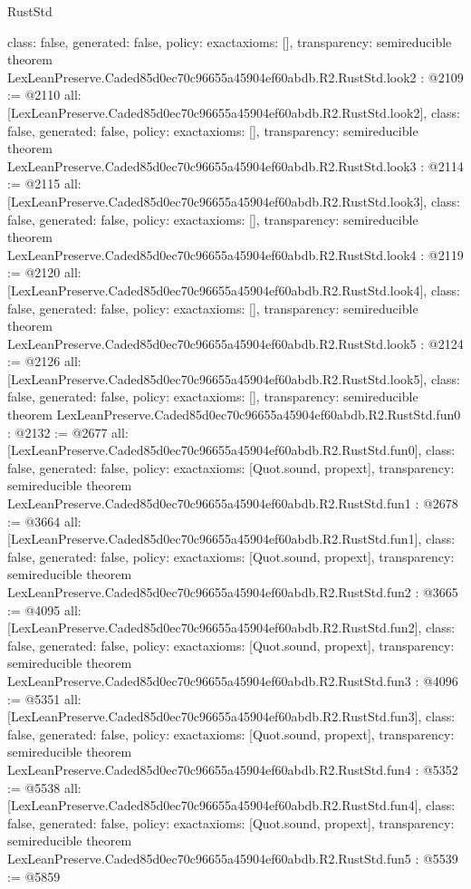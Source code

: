 \begin{lexlean}{RustStd}
\begin{coremodule}
{  class: false,
  generated: false,
  policy: exact{axioms: []},
  transparency: semireducible
}
theorem LexLeanPreserve.Caded85d0ec70c96655a45904ef60abdb.R2.RustStd.look2 : @2109 := @2110 {
  all: [LexLeanPreserve.Caded85d0ec70c96655a45904ef60abdb.R2.RustStd.look2],
  class: false,
  generated: false,
  policy: exact{axioms: []},
  transparency: semireducible
}
theorem LexLeanPreserve.Caded85d0ec70c96655a45904ef60abdb.R2.RustStd.look3 : @2114 := @2115 {
  all: [LexLeanPreserve.Caded85d0ec70c96655a45904ef60abdb.R2.RustStd.look3],
  class: false,
  generated: false,
  policy: exact{axioms: []},
  transparency: semireducible
}
theorem LexLeanPreserve.Caded85d0ec70c96655a45904ef60abdb.R2.RustStd.look4 : @2119 := @2120 {
  all: [LexLeanPreserve.Caded85d0ec70c96655a45904ef60abdb.R2.RustStd.look4],
  class: false,
  generated: false,
  policy: exact{axioms: []},
  transparency: semireducible
}
theorem LexLeanPreserve.Caded85d0ec70c96655a45904ef60abdb.R2.RustStd.look5 : @2124 := @2126 {
  all: [LexLeanPreserve.Caded85d0ec70c96655a45904ef60abdb.R2.RustStd.look5],
  class: false,
  generated: false,
  policy: exact{axioms: []},
  transparency: semireducible
}
theorem LexLeanPreserve.Caded85d0ec70c96655a45904ef60abdb.R2.RustStd.fun0 : @2132 := @2677 {
  all: [LexLeanPreserve.Caded85d0ec70c96655a45904ef60abdb.R2.RustStd.fun0],
  class: false,
  generated: false,
  policy: exact{axioms: [Quot.sound, propext]},
  transparency: semireducible
}
theorem LexLeanPreserve.Caded85d0ec70c96655a45904ef60abdb.R2.RustStd.fun1 : @2678 := @3664 {
  all: [LexLeanPreserve.Caded85d0ec70c96655a45904ef60abdb.R2.RustStd.fun1],
  class: false,
  generated: false,
  policy: exact{axioms: [Quot.sound, propext]},
  transparency: semireducible
}
theorem LexLeanPreserve.Caded85d0ec70c96655a45904ef60abdb.R2.RustStd.fun2 : @3665 := @4095 {
  all: [LexLeanPreserve.Caded85d0ec70c96655a45904ef60abdb.R2.RustStd.fun2],
  class: false,
  generated: false,
  policy: exact{axioms: [Quot.sound, propext]},
  transparency: semireducible
}
theorem LexLeanPreserve.Caded85d0ec70c96655a45904ef60abdb.R2.RustStd.fun3 : @4096 := @5351 {
  all: [LexLeanPreserve.Caded85d0ec70c96655a45904ef60abdb.R2.RustStd.fun3],
  class: false,
  generated: false,
  policy: exact{axioms: [Quot.sound, propext]},
  transparency: semireducible
}
theorem LexLeanPreserve.Caded85d0ec70c96655a45904ef60abdb.R2.RustStd.fun4 : @5352 := @5538 {
  all: [LexLeanPreserve.Caded85d0ec70c96655a45904ef60abdb.R2.RustStd.fun4],
  class: false,
  generated: false,
  policy: exact{axioms: [Quot.sound, propext]},
  transparency: semireducible
}
theorem LexLeanPreserve.Caded85d0ec70c96655a45904ef60abdb.R2.RustStd.fun5 : @5539 := @5859 {
}
\end{coremodule}
\end{lexlean}
